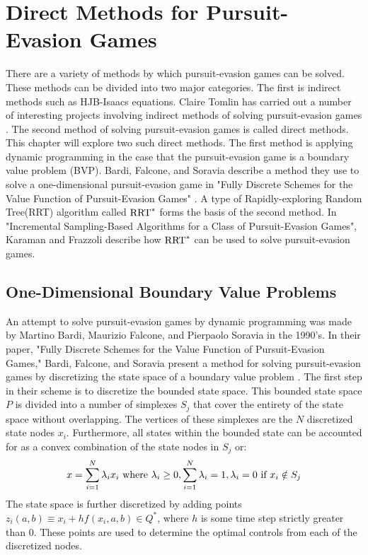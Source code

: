\chapter{Direct Methods for Pursuit-Evasion Games}\label{chp:app}
There are a variety of methods by which pursuit-evasion games can be solved. These methods can be divided into two major categories. The first is indirect methods such as HJB-Isaacs equations. Claire Tomlin has carried out a number of interesting projects involving indirect methods of solving pursuit-evasion games \cite{tomlin1,tomlin2}. The second method of solving pursuit-evasion games is called direct methods. This chapter will explore two such direct methods. The first method is applying dynamic programming in the case that the pursuit-evasion game is a boundary value problem (BVP). Bardi, Falcone, and Soravia describe a method they use to solve a one-dimensional pursuit-evasion game in "Fully Discrete Schemes for the Value Function of Pursuit-Evasion Games" \cite{bardi2}. A type of Rapidly-exploring Random Tree(RRT) algorithm called $\textnormal{RRT}^*$ forms the basis of the second method. In "Incremental Sampling-Based Algorithms for a Class of Pursuit-Evasion Games", Karaman and Frazzoli describe how $\textnormal{RRT}^*$ can be used to solve pursuit-evasion games.  

\section{One-Dimensional Boundary Value Problems}\label{1dbvp}

An attempt to solve pursuit-evasion games by dynamic programming was made by Martino Bardi, Maurizio Falcone, and Pierpaolo Soravia in the 1990's. In their paper, "Fully Discrete Schemes for the Value Function of Pursuit-Evasion Games," Bardi, Falcone, and Soravia present a method for solving pursuit-evasion games by discretizing the state space of a boundary value problem \cite{bardi2}. The first step in their scheme is to discretize the bounded state space. This bounded state space $P$ is divided into a number of simplexes ${S_j}$ that cover the entirety of the state space without overlapping. The vertices of these simplexes are the $N$ discretized state nodes $x_i$. Furthermore, all states within the bounded state can be accounted for as a convex combination of the state nodes in $S_j$ or:
\begin{equation}
x= \sum_{i=1}^{N} \lambda_i x_i \textnormal{ where } \lambda_i \ge 0,  \sum_{i=1}^{N}\lambda_i=1,\lambda_i = 0 \textnormal{ if } x_i\notin S_j
\end{equation}
The state space is further discretized by adding points $z_i(a,b) \equiv x_i+hf(x_i,a,b) \in Q^*$, where $h$ is some time step strictly greater than 0. These points are used to determine the optimal controls from each of the discretized nodes.

